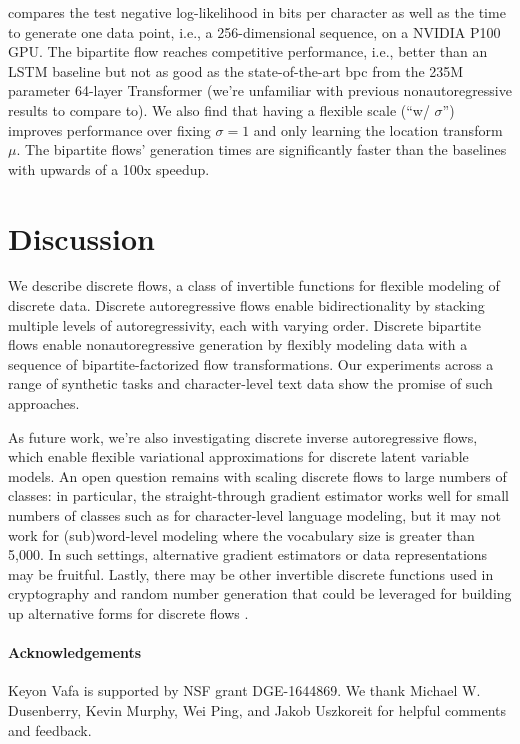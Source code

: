 \documentclass{article}
\begin{document}
 compares the test negative log-likelihood in bits per character as well as the time to generate one data point, i.e., a 256-dimensional sequence, on a NVIDIA P100 GPU. The bipartite flow reaches competitive performance, i.e., better than an LSTM baseline but not as good as the state-of-the-art bpc from the 235M parameter 64-layer Transformer (we're unfamiliar with previous nonautoregressive results to compare to). We also find that having a flexible scale (``w/ $\sigma$'') improves performance over fixing $\sigma=1$ and only learning the location transform $\mu$. The bipartite flows' generation times are significantly faster than the baselines with upwards of a 100x speedup.







\section{Discussion}

We describe discrete flows, a class of invertible functions for flexible modeling of discrete data. Discrete autoregressive flows enable bidirectionality by stacking multiple levels of autoregressivity, each with varying order. Discrete bipartite flows enable nonautoregressive generation by flexibly modeling data with a sequence of bipartite-factorized flow transformations. Our experiments across a range of synthetic tasks and character-level text data show the promise of such approaches.

As future work, we're also investigating discrete inverse autoregressive flows, which enable flexible variational approximations for discrete latent variable models. An open question remains with scaling discrete flows to large numbers of classes: in particular, the straight-through gradient estimator works well for small numbers of classes such as for character-level language modeling, but it may not work for (sub)word-level modeling where the vocabulary size is greater than 5,000. In such settings, alternative gradient estimators or data representations may be fruitful. Lastly, there may be other invertible discrete functions used in cryptography and random number generation that could be leveraged for building up alternative forms for discrete flows \citep{salmon2011parallel}.

\paragraph{Acknowledgements}
Keyon Vafa is supported by NSF grant DGE-1644869.
We thank Michael W. Dusenberry, Kevin Murphy, Wei Ping, and Jakob Uszkoreit for helpful comments and feedback.
\end{document}
